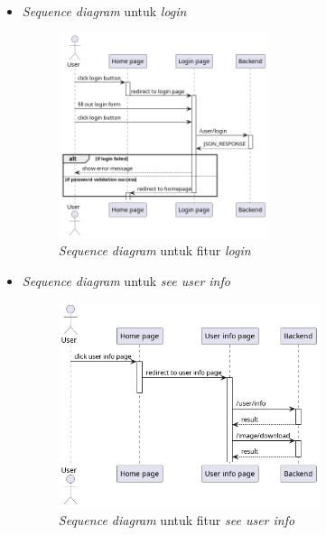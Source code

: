 \documentclass[a4paper]{article}
\begin{document}
\begin{enumerate}
\begin{enumerate}
\begin{itemize}
            \newpage
            \item \textit{Sequence diagram} untuk \textit{login}
            \begin{figure}[h]
                \centering
                \includegraphics*[height=6cm]{diagram/sequence diagram/FE/3. login/login.png}
                \caption{\textit{Sequence diagram} untuk fitur \textit{login}}
            \end{figure}

            \item \textit{Sequence diagram} untuk \textit{see user info}
            \begin{figure}[h]
                \centering
                \includegraphics*[height=6cm]{diagram/sequence diagram/FE/4. see user info/template.png}
                \caption{\textit{Sequence diagram} untuk fitur \textit{see user info}}
            \end{figure}


\end{itemize}
\end{enumerate}
\end{enumerate}
\end{document}
